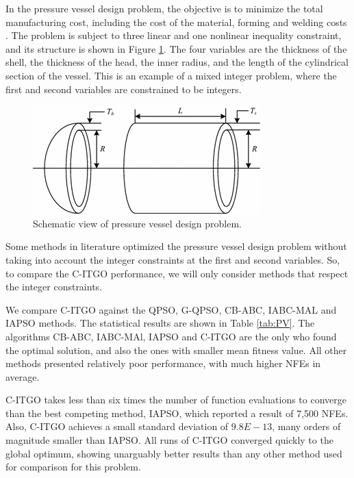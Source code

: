 In the pressure vessel design problem, the objective is to minimize the total manufacturing cost, including the cost of the material, forming and welding costs \citep{PV}. The problem is subject to three linear and one nonlinear inequality constraint, and its structure is shown in Figure \ref{fig:PV}. The four variables are the thickness of the shell, the thickness of the head, the inner radius, and the length of the cylindrical section of the vessel. This is an example of a mixed integer problem, where the first and second variables are constrained to be integers.


\begin{figure}[h]
\begin{center}
\includegraphics[scale=0.6]{Imgs/PV.png}
\end{center}
\captionsetup{justification=centering}
\caption{Schematic view of pressure vessel design problem.}\label{fig:PV}
\end{figure}


Some methods in literature optimized the pressure vessel design problem without taking into account the integer constraints at the first and second variables. So, to compare the C-ITGO performance, we will only consider methods that respect the integer constraints.



We compare C-ITGO against the  QPSO, G-QPSO, CB-ABC, IABC-MAL and IAPSO methods. The statistical results are shown in Table \ref{tab:PV}. The algorithms CB-ABC, IABC-MAl, IAPSO and C-ITGO are the only who found the optimal solution, and also the ones with smaller mean fitness value. All other methods presented relatively poor performance, with much higher NFEs in average.

C-ITGO takes less than six times the number of function evaluations to converge than the best competing method, IAPSO, which reported a result of 7,500 NFEs. Also, C-ITGO achieves a small standard deviation of $9.8E-13$, many orders of magnitude smaller than IAPSO. All runs of C-ITGO converged quickly to the global optimum, showing unarguably better results than any other method used for comparison for this problem.



